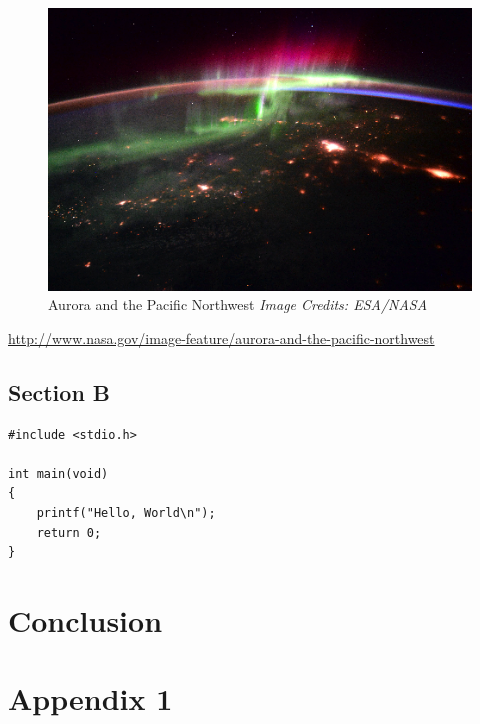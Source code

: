 \begin{figure}[ht]
	\centering
    \includegraphics[width=1\textwidth]{figures/aurora.jpg}
	\caption{Aurora and the Pacific Northwest \emph{Image Credits: ESA/NASA}}
	\label{fig:aurora}
\end{figure}

\url{http://www.nasa.gov/image-feature/aurora-and-the-pacific-northwest}

\section{Section B}
\label{sec:b}
\lipsum[4] \textcite{doe2005}

\begin{singlespace}
\begin{lstlisting}[caption=C Hello World, label=lst:hello_world]
#include <stdio.h>

int main(void)
{
	printf("Hello, World\n");
    return 0;
}
\end{lstlisting}
\end{singlespace}

\chapter{Conclusion}
\label{sec:conclusion}
\lipsum[1]

\printbibliography
\appendix
\chapter{Appendix 1}

\newpage
